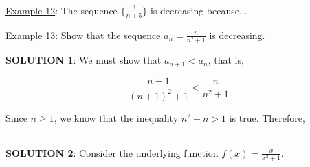 \documentclass[paper=a4, fontsize=11pt]{scrartcl} %
\numberwithin{equation}{section} %
\numberwithin{figure}{section} %
\numberwithin{table}{section} %
\newcommand{\ds}{\displaystyle}
\begin{document}
  \indent\\
  \indent
  \newpage
  \underline{Example 12}: The sequence $\lbrace \ds\frac{3}{n+5}\rbrace$ is decreasing because...
  
  \vspace{1in}
  
  \indent
  
  \underline{Example 13}: Show that the sequence $a_n = \ds\frac{n}{n^2+1}$ is decreasing.\\
  \indent
  
  \textbf{SOLUTION 1}: We must show that $a_{n+1}<a_n$, that is,
  
  \[\ds\frac{n+1}{(n+1)^2+1}<\ds\frac{n}{n^2+1}\]
  
  \vspace{1.75in}
  
  Since $n\geq 1$, we know that the inequality $n^2+n>1$ is true. Therefore,
  
  \[\underline{\hspace{4in}}\]
  
 \indent
 
 \textbf{SOLUTION 2}: Consider the underlying function $f(x) = \ds\frac{x}{x^2+1}$.\\
 \indent
 
\vspace{2in}

\indent
\end{document}
